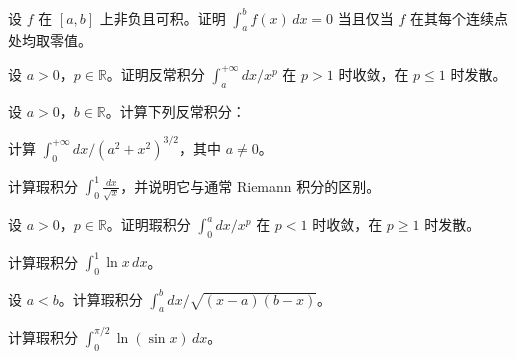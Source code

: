\noindent\begin{minipage}{\textwidth}
设 $f$ 在 $[a,b]$ 上非负且可积。证明 $\int_a^b f(x)\,dx=0$ 当且仅当 $f$ 在其每个连续点处均取零值。
\end{minipage}\par\vfill
\newpage
\noindent\begin{minipage}{\textwidth}
设 $a>0$，$p\in\mathbb R$。证明反常积分 $\int_a^{+\infty}dx/x^p$ 在 $p>1$ 时收敛，在 $p\le1$ 时发散。
\end{minipage}\par\vfill
\noindent\begin{minipage}{\textwidth}
设 $a>0$，$b\in\mathbb R$。计算下列反常积分：
\end{minipage}\par\vfill
\noindent\begin{minipage}{\textwidth}
计算 $\int_0^{+\infty}dx/(a^2+x^2)^{3/2}$，其中 $a\ne0$。
\end{minipage}\par\vfill
\newpage
\noindent\begin{minipage}{\textwidth}
计算瑕积分 $\displaystyle\int_0^1\frac{dx}{\sqrt{x}}$，并说明它与通常 Riemann 积分的区别。
\end{minipage}\par\vfill
\noindent\begin{minipage}{\textwidth}
设 $a>0$，$p\in\mathbb R$。证明瑕积分 $\int_0^a dx/x^p$ 在 $p<1$ 时收敛，在 $p\ge1$ 时发散。
\end{minipage}\par\vfill
\noindent\begin{minipage}{\textwidth}
计算瑕积分 $\int_0^1\ln x\,dx$。
\end{minipage}\par\vfill
\newpage
\noindent\begin{minipage}{\textwidth}
设 $a<b$。计算瑕积分 $\int_a^b dx/\sqrt{(x-a)(b-x)}$。
\end{minipage}\par\vfill
\noindent\begin{minipage}{\textwidth}
计算瑕积分 $\int_0^{\pi/2}\ln(\sin x)\,dx$。
\end{minipage}\par\vfill
